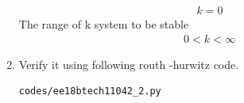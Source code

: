 \begin{enumerate}[label=\thesubsection.\arabic*.,ref=\thesubsection.\theenumi]
\begin{align}
k = 0
\label{eq:ee18btech11042_8}
\end{align}
The range of k system to be stable
\begin{align}
0<k<\infty
\label{eq:ee18btech11042_9}
\end{align}
\item Verify it using following routh -hurwitz code.
\begin{lstlisting}
codes/ee18btech11042_2.py
\end{lstlisting}
\end{enumerate}
